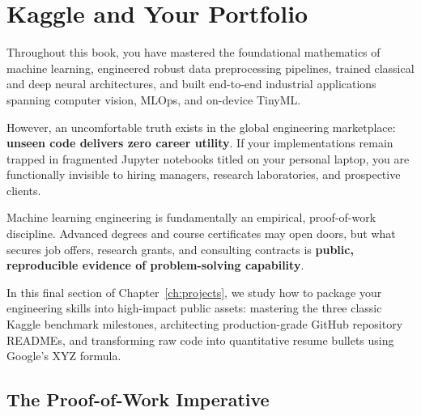\section{Kaggle and Your Portfolio}\label{sec:kaggle_portfolio}

Throughout this book, you have mastered the foundational mathematics of machine learning, engineered robust data preprocessing pipelines, trained classical and deep neural architectures, and built end-to-end industrial applications spanning computer vision, MLOps, and on-device TinyML.

However, an uncomfortable truth exists in the global engineering marketplace: \textbf{unseen code delivers zero career utility}. If your implementations remain trapped in fragmented Jupyter notebooks titled  on your personal laptop, you are functionally invisible to hiring managers, research laboratories, and prospective clients.

Machine learning engineering is fundamentally an empirical, proof-of-work discipline. Advanced degrees and course certificates may open doors, but what secures job offers, research grants, and consulting contracts is \textbf{public, reproducible evidence of problem-solving capability}. 

In this final section of Chapter~\ref{ch:projects}, we study how to package your engineering skills into high-impact public assets: mastering the three classic Kaggle benchmark milestones, architecting production-grade GitHub repository READMEs, and transforming raw code into quantitative resume bullets using Google's XYZ formula.

\subsection{The Proof-of-Work Imperative}\label{subsec:proof_of_work}

